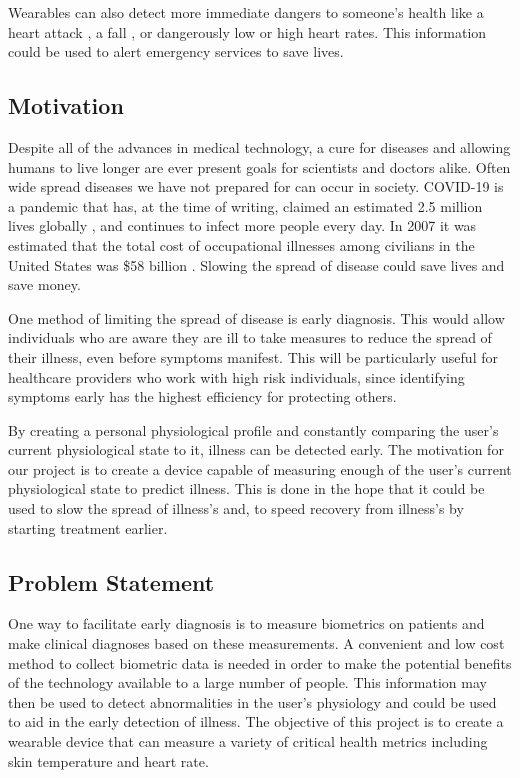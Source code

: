 Wearables can also detect more immediate dangers to someone's health like a
heart attack \cite{heart-attack}, a fall \cite{Khojasteh_2018}, or dangerously
low or high heart rates.  This information could be used to alert emergency
services to save lives.

\subsection{Motivation}

Despite all of the advances in medical technology, a cure for diseases and
allowing humans to live longer are ever present goals for scientists and 
doctors alike.  Often wide spread diseases we have not prepared for can occur in
society.  COVID-19 is a pandemic that
has, at the time of writing, claimed an estimated 2.5 million lives globally
\cite{johns-hopkins-corona-chan}, and continues to infect more people every
day.  In 2007 it was estimated that the total cost of occupational illnesses
among civilians in the United States was \$58 billion \cite{Leigh2011}.
Slowing the spread of disease could save lives and save money.

One method of limiting the spread of disease is early diagnosis.  This would
allow individuals who are aware they are ill to take measures to reduce the
spread of their illness, even before symptoms manifest.  This will be
particularly useful for healthcare providers who work with high risk
individuals, since identifying symptoms early has the highest efficiency for
protecting others.

By creating a personal physiological profile and constantly
comparing the user's current physiological state to it, illness can be detected
early.  The motivation for our project is to create a device capable of measuring 
enough of the user's current physiological state to predict illness.  This is done 
in the hope that it could be used to slow the spread of illness's and, to speed
recovery from illness's by starting treatment earlier.

\subsection{Problem Statement}

One way to facilitate early diagnosis is to measure biometrics on patients and
make clinical diagnoses based on these measurements.
A convenient and low cost method to collect biometric data is needed in order
to make the potential benefits of the technology available to a large number of
people. This information may then be used to detect abnormalities in the user’s 
physiology and could be used to aid in the early detection of illness.
The objective of this project is to create a wearable device that can measure a
variety of critical health metrics including skin temperature and heart rate.

